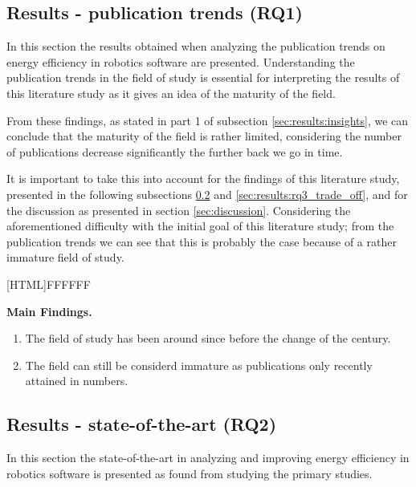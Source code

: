 \subsection{Results - publication trends (RQ1)}
\label{sec:results:rq1_pub_trends}

In this section the results obtained when analyzing the publication trends on energy efficiency in robotics software are presented.
Understanding the publication trends in the field of study is essential for interpreting the results of this literature study as it gives
an idea of the maturity of the field. 

\vspace{2mm}

From these findings, as stated in part 1 of subsection \ref{sec:results:insights}, we can conclude that the maturity of the field is rather limited,
considering the number of publications decrease significantly the further back we go in time.

\vspace{2mm}

It is important to take this into account for the findings of this literature study, presented in the following subsections 
\ref{sec:results:rq2_state_of_the_art} and \ref{sec:results:rq3_trade_off}, and for the discussion as presented in section \ref{sec:discussion}.
Considering the aforementioned difficulty with the initial goal of this literature study; from the publication trends we can see that this 
is probably the case because of a rather immature field of study.

\vspace{5mm}

\noindent{}[HTML]{FFFFFF}{\parbox{0.47\textwidth}{%
\noindent \textbf{Main Findings.}
\begin{enumerate}[nolistsep]
\item The field of study has been around since before the change of the century.
\item The field can still be considerd immature as publications only recently attained in numbers.
\end{enumerate}}}

\newpage

\subsection{Results - state-of-the-art (RQ2)}
\label{sec:results:rq2_state_of_the_art}
In this section the state-of-the-art in analyzing and improving energy efficiency in robotics software is presented as found from studying the primary studies.

